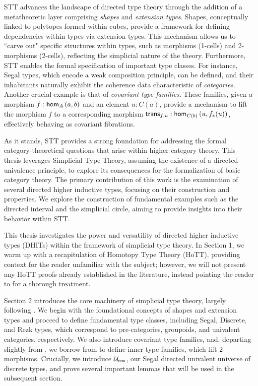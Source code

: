 \documentclass[main.tex]{subfiles}
\begin{document}
STT advances the landscape of directed type theory through the addition of a metatheoretic layer comprising \textit{shapes} and \textit{extension types}. Shapes, conceptually linked to polytopes formed within cubes, provide a framework for defining dependencies within types via extension types. This mechanism allows us to ``carve out" specific structures within types, such as morphisms (1-cells) and 2-morphisms (2-cells), reflecting the simplicial nature of the theory. Furthermore, STT enables the formal specification of important type classes. For instance, Segal types, which encode a weak composition principle, can be defined, and their inhabitants naturally exhibit the coherence data characteristic of \textit{categories}. Another crucial example is that of \textit{covariant type families}. These families, given a morphism $f : \ho[A]{a}{b}$ and an element $u : C(a)$, provide a mechanism to lift the morphism $f$ to a corresponding morphism $\trans{f}{u}:\ho[C(b)]{u}{f_*(u)}$, effectively behaving as covariant fibrations.

As it stands, STT provides a strong foundation for addressing the formal category-theoretical questions that arise within higher category theory. This thesis leverages Simplicial Type Theory, assuming the existence of a directed univalence principle, to explore its consequences for the formalization of basic category theory. The primary contribution of this work is the examination of several directed higher inductive types, focusing on their construction and properties. We explore the construction of fundamental examples such as the directed interval and the simplicial circle, aiming to provide insights into their behavior within STT.

This thesis investigates the power and versatility of directed higher inductive types (DHITs) within the framework of simplicial type theory. In Section 1, we warm up with a recapitulation of Homotopy Type Theory (HoTT), providing context for the reader unfamiliar with the subject; however, we will not present any HoTT proofs already established in the literature, instead pointing the reader to \cite{program_homotopy_2013} for a thorough treatment. 

Section 2 introduces the core machinery of simplicial type theory, largely following \cite{riehl_type_2017}. We begin with the foundational concepts of shapes and extension types and proceed to define fundamental type classes, including Segal, Discrete, and Rezk types, which correspond to pre-categories, groupoids, and univalent categories, respectively. We also introduce covariant type families, and, departing slightly from \cite{riehl_type_2017}, we borrow from \cite{buchholtz_synthetic_2022} to define inner type families, which lift 2-morphisms. Crucially, we introduce $\uc$, our Segal directed univalent universe of discrete types, and prove several important lemmas that will be used in the subsequent section. 
\end{document}
